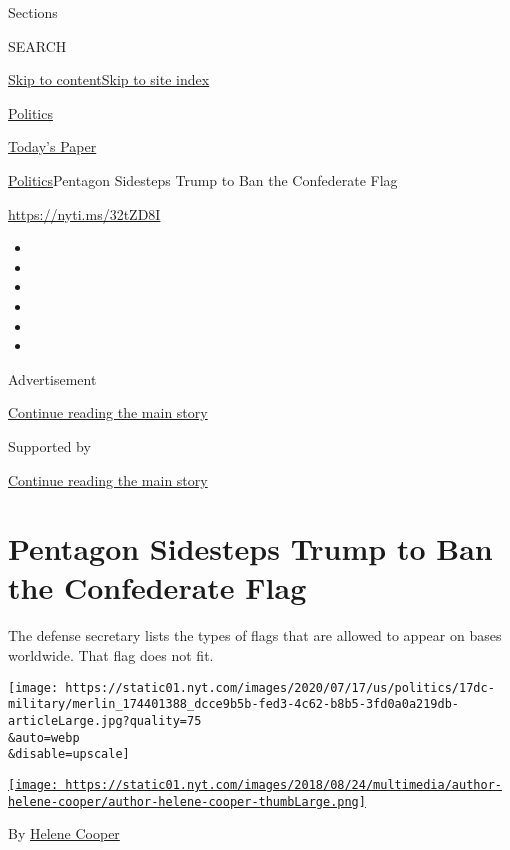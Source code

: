 Sections

SEARCH

\protect\hyperlink{site-content}{Skip to
content}\protect\hyperlink{site-index}{Skip to site index}

\href{https://www.nytimes.com/section/politics}{Politics}

\href{https://myaccount.nytimes.com/auth/login?response_type=cookie\&client_id=vi}{}

\href{https://www.nytimes.com/section/todayspaper}{Today's Paper}

\href{/section/politics}{Politics}\textbar{}Pentagon Sidesteps Trump to
Ban the Confederate Flag

\url{https://nyti.ms/32tZD8I}

\begin{itemize}
\item
\item
\item
\item
\item
\item
\end{itemize}

Advertisement

\protect\hyperlink{after-top}{Continue reading the main story}

Supported by

\protect\hyperlink{after-sponsor}{Continue reading the main story}

\hypertarget{pentagon-sidesteps-trump-to-ban-the-confederate-flag}{%
\section{Pentagon Sidesteps Trump to Ban the Confederate
Flag}\label{pentagon-sidesteps-trump-to-ban-the-confederate-flag}}

The defense secretary lists the types of flags that are allowed to
appear on bases worldwide. That flag does not fit.

\texttt{[image: https://static01.nyt.com/images/2020/07/17/us/politics/17dc-military/merlin\_174401388\_dcce9b5b-fed3-4c62-b8b5-3fd0a0a219db-articleLarge.jpg?quality=75\\\&auto=webp\\\&disable=upscale]}

\href{https://www.nytimes.com/by/helene-cooper}{\texttt{[image: https://static01.nyt.com/images/2018/08/24/multimedia/author-helene-cooper/author-helene-cooper-thumbLarge.png]}}

By \href{https://www.nytimes.com/by/helene-cooper}{Helene Cooper}

